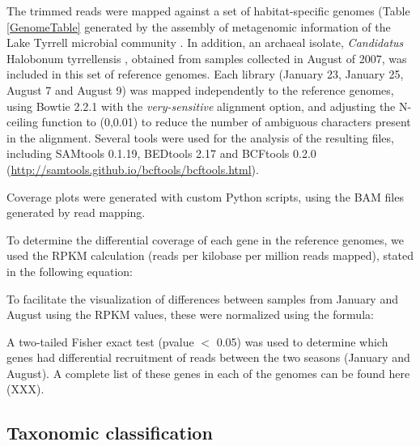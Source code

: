 The trimmed reads were mapped against a set of habitat-specific genomes (Table \ref{GenomeTable} generated by the assembly of metagenomic information of the Lake Tyrrell microbial community \cite{Narasingarao:2012kp,Podell:2013kx,Podell:2013fp}. In addition, an archaeal isolate, \textit{Candidatus} Halobonum tyrrellensis \cite{Ugalde:2013hb}, obtained from samples collected in August of 2007, was included in this set of reference genomes. Each library (January 23, January 25, August 7 and August 9) was mapped independently to the reference genomes, using Bowtie 2.2.1 \cite{Langmead:2012jh} with the \textit{very-sensitive} alignment option, and adjusting the N-ceiling function to (0,0.01) to reduce the number of ambiguous characters present in the alignment. Several tools were used for the analysis of the resulting files, including SAMtools 0.1.19\cite{Li:2009ka}, BEDtools 2.17 \cite{Quinlan:2010km} and BCFtools 0.2.0 (\url{http://samtools.github.io/bcftools/bcftools.html}).

Coverage plots were generated with custom Python scripts, using the BAM files generated by read mapping.

To determine the differential coverage of each gene in the reference genomes, we used the RPKM calculation (reads per kilobase per million reads mapped), stated in the following equation:

\begin{center}
\end{center}

To facilitate the visualization of differences between samples from January and August using the RPKM values, these were normalized using the formula:

\begin{center}
\end{center}

A two-tailed Fisher exact test (pvalue $<$ 0.05) was used to determine which genes had differential recruitment of reads between the two seasons (January and August). A complete list of these genes in each of the genomes can be found here (XXX).

\subsection{Taxonomic classification}

